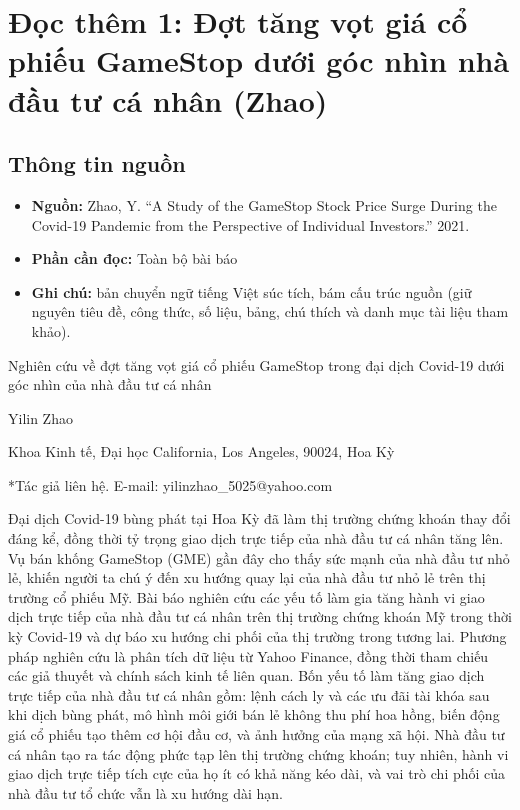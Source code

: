 \chapter{Đọc thêm 1: Đợt tăng vọt giá cổ phiếu GameStop dưới góc nhìn nhà đầu tư cá nhân (Zhao)}
\label{ch:M6L4DocThem1}

\section{Thông tin nguồn}

\begin{itemize}
  \item \textbf{Nguồn:} Zhao, Y. ``A Study of the GameStop Stock Price Surge During the Covid-19 Pandemic from the Perspective of Individual Investors.'' 2021.
  \item \textbf{Phần cần đọc:} Toàn bộ bài báo
  \item \textbf{Ghi chú:} bản chuyển ngữ tiếng Việt súc tích, bám cấu trúc nguồn (giữ nguyên tiêu đề, công thức, số liệu, bảng, chú thích và danh mục tài liệu tham khảo).
\end{itemize}

Nghiên cứu về đợt tăng vọt giá cổ phiếu GameStop trong đại dịch Covid-19 dưới góc nhìn của nhà đầu tư cá nhân

Yilin Zhao

Khoa Kinh tế, Đại học California, Los Angeles, 90024, Hoa Kỳ

*Tác giả liên hệ. E-mail: yilinzhao\_5025@yahoo.com

Đại dịch Covid-19 bùng phát tại Hoa Kỳ đã làm thị trường chứng khoán thay đổi đáng kể, đồng thời tỷ trọng giao dịch trực tiếp của nhà đầu tư cá nhân tăng lên. Vụ bán khống GameStop (GME) gần đây cho thấy sức mạnh của nhà đầu tư nhỏ lẻ, khiến người ta chú ý đến xu hướng quay lại của nhà đầu tư nhỏ lẻ trên thị trường cổ phiếu Mỹ. Bài báo nghiên cứu các yếu tố làm gia tăng hành vi giao dịch trực tiếp của nhà đầu tư cá nhân trên thị trường chứng khoán Mỹ trong thời kỳ Covid-19 và dự báo xu hướng chi phối của thị trường trong tương lai. Phương pháp nghiên cứu là phân tích dữ liệu từ Yahoo Finance, đồng thời tham chiếu các giả thuyết và chính sách kinh tế liên quan. Bốn yếu tố làm tăng giao dịch trực tiếp của nhà đầu tư cá nhân gồm: lệnh cách ly và các ưu đãi tài khóa sau khi dịch bùng phát, mô hình môi giới bán lẻ không thu phí hoa hồng, biến động giá cổ phiếu tạo thêm cơ hội đầu cơ, và ảnh hưởng của mạng xã hội. Nhà đầu tư cá nhân tạo ra tác động phức tạp lên thị trường chứng khoán; tuy nhiên, hành vi giao dịch trực tiếp tích cực của họ ít có khả năng kéo dài, và vai trò chi phối của nhà đầu tư tổ chức vẫn là xu hướng dài hạn.

